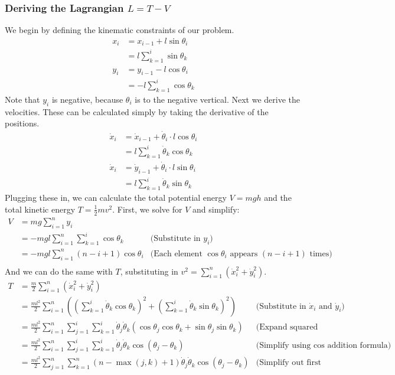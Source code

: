 \documentclass{article}
\begin{document}
\subsubsection{Deriving the Lagrangian \texorpdfstring{$L=T-V$}{L=T-V}}
We begin by defining the kinematic constraints of our problem.
\begin{align*}
	x_i &= x_{i-1} + l\sin{\theta_i}\\
	&= l\sum_{k=1}^i\sin{\theta_k}\\
	y_i &= y_{i-1} - l\cos{\theta_i}\\
	&= -l\sum_{k=1}^i\cos{\theta_k}
\end{align*}
Note that $y_i$ is negative, because $\theta_i$ is to the negative vertical. Next we derive the velocities. These can be calculated simply by taking the derivative of the positions.
\begin{align*}
	\dot{x}_i &= \dot x_{i-1} + \dot\theta_i \cdot l\cos{\theta_i}\\
	&= l\sum_{k=1}^i\dot\theta_k\cos{\theta_k}\\
	\dot{x}_i &= \dot y_{i-1} + \dot\theta_i \cdot l\sin{\theta_i}\\
	&= l\sum_{k=1}^i\dot\theta_k\sin{\theta_k}
\end{align*}
Plugging these in, we can calculate the total potential energy $V=mgh$ and the total kinetic energy $T=\frac{1}{2}mv^2$. First, we solve for $V$ and simplify:
\begin{align*}
	V &= mg\sum_{i=1}^n y_i \\
	&=-mgl\sum_{i=1}^n\sum_{k=1}^i\cos\theta_k
	&\text{(Substitute in $y_i$)}\\
	&=-mgl\sum_{i=1}^n (n-i+1)\cos\theta_i
	&\text{(Each element $\cos\theta_i$ appears $(n-i+1)$ times)}\\
\end{align*}
And we can do the same with $T$, substituting in $v^2=\sum_{i=1}^n\left(\dot{x}_i^2+\dot{y}_i^2\right)$.
\begin{align*}
	T &= \frac{m}{2}\sum_{i=1}^n \left(\dot{x}_i^2+\dot{y}_i^2\right)\\
	&= \frac{ml^2}{2}\sum_{i=1}^n \left(\left(\sum_{k=1}^i\dot\theta_k\cos{\theta_k}\right)^2+\left(\sum_{k=1}^i\dot\theta_k\sin{\theta_k}\right)^2\right)
	&\text{(Substitute in $\dot x_i$ and $\dot y_i$)}\\
	&= \frac{ml^2}{2}\sum_{i=1}^n \sum_{j=1}^i\sum_{k=1}^i\dot\theta_j\dot\theta_k\left(\cos{\theta_j}\cos{\theta_k}+\sin{\theta_j}\sin{\theta_k}\right)
	&\text{(Expand squared sums)}\\
	&= \frac{ml^2}{2}\sum_{i=1}^n \sum_{j=1}^i\sum_{k=1}^i\dot\theta_j\dot\theta_k\cos(\theta_j-\theta_k)
	&\text{(Simplify using $\cos$ addition formula)}\\
	&= \frac{ml^2}{2} \sum_{j=1}^n\sum_{k=1}^n(n-\max(j,k)+1)\dot\theta_j\dot\theta_k\cos(\theta_j-\theta_k)
	&\text{(Simplify out first sum)}\\
\end{align*}
\end{document}

